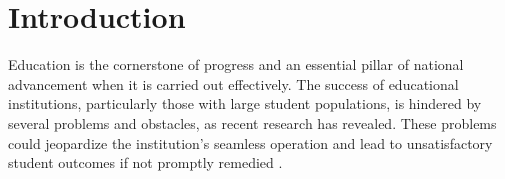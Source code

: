 \documentclass[10pt]{NSP1}
\begin{document}
\keywords{----------------} 



\maketitle

\section{Introduction}

Education is the cornerstone of progress and an essential pillar of national advancement when it is carried out effectively. The success of educational institutions, particularly those with large student populations, is hindered by several problems and obstacles, as recent research has revealed. These problems could jeopardize the institution's seamless operation and lead to unsatisfactory student outcomes if not promptly remedied \cite{R1}.
\end{document}
